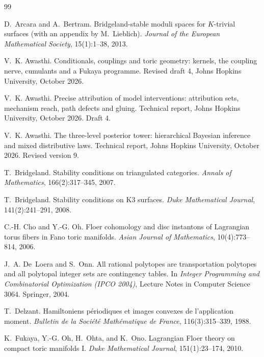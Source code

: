 \documentclass[11pt]{article}
\theoremstyle{definition}
\theoremstyle{remark}
\begin{document}
\begin{thebibliography}{99}

D.~Arcara and A.~Bertram.
\newblock Bridgeland-stable moduli spaces for {$K$}-trivial surfaces (with an appendix by M.~Lieblich).
\newblock \emph{Journal of the European Mathematical Society}, 15(1):1--38, 2013.

V.~K. Awasthi.
\newblock Conditionals, couplings and toric geometry: kernels, the coupling nerve, cumulants and a {F}ukaya
programme.
\newblock Revised draft 4, Johns Hopkins University, October 2026.

V.~K. Awasthi.
\newblock Precise attribution of model interventions: attribution sets, mechanism reach, path defects
and gluing.
\newblock Technical report, Johns Hopkins University, October 2026. Draft 4.

V.~K. Awasthi.
\newblock The three-level posterior tower: hierarchical {B}ayesian inference and mixed distributive laws.
\newblock Technical report, Johns Hopkins University, October 2026. Revised version 9.

T.~Bridgeland.
\newblock Stability conditions on triangulated categories.
\newblock \emph{Annals of Mathematics}, 166(2):317--345, 2007.

T.~Bridgeland.
\newblock Stability conditions on {K}3 surfaces.
\newblock \emph{Duke Mathematical Journal}, 141(2):241--291, 2008.

C.-H. Cho and Y.-G. Oh.
\newblock Floer cohomology and disc instantons of {L}agrangian torus fibers in {F}ano toric manifolds.
\newblock \emph{Asian Journal of Mathematics}, 10(4):773--814, 2006.

J.~A. De~Loera and S.~Onn.
\newblock All rational polytopes are transportation polytopes and all polytopal integer sets are contingency
tables.
\newblock In \emph{Integer Programming and Combinatorial Optimization (IPCO 2004)}, Lecture Notes in Computer
Science 3064. Springer, 2004.

T.~Delzant.
\newblock Hamiltoniens p\'eriodiques et images convexes de l'application moment.
\newblock \emph{Bulletin de la Soci\'et\'e Math\'ematique de France}, 116(3):315--339, 1988.

K.~Fukaya, Y.-G. Oh, H.~Ohta, and K.~Ono.
\newblock Lagrangian {F}loer theory on compact toric manifolds {I}.
\newblock \emph{Duke Mathematical Journal}, 151(1):23--174, 2010.


\end{thebibliography}
\end{document}
